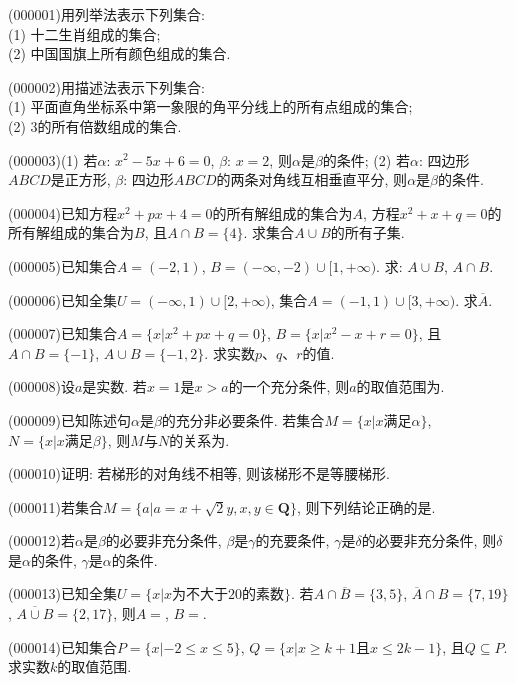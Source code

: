 \item (000001)用列举法表示下列集合:\\
(1) 十二生肖组成的集合;\\
(2) 中国国旗上所有颜色组成的集合.
\item (000002)用描述法表示下列集合:\\
(1) 平面直角坐标系中第一象限的角平分线上的所有点组成的集合;\\
(2) $3$的所有倍数组成的集合.
\item (000003)(1) 若$\alpha$: $x^2-5x+6=0$, $\beta$: $x=2$, 则$\alpha$是$\beta$的条件;
(2) 若$\alpha$: 四边形$ABCD$是正方形, $\beta$: 四边形$ABCD$的两条对角线互相垂直平分, 则$\alpha$是$\beta$的条件.
\item (000004)已知方程$x^2+px+4=0$的所有解组成的集合为$A$, 方程$x^2+x+q=0$的所有解组成的集合为$B$, 且$A\cap B=\{4\}$. 求集合$A\cup B$的所有子集.
\item (000005)已知集合$A=(-2, 1)$, $B=(-\infty, -2)\cup [1, +\infty)$. 求: $A\cup B$, $A\cap B$.
\item (000006)已知全集$U=(-\infty, 1)\cup [2, +\infty)$, 集合$A=(-1, 1)\cup [3, +\infty)$. 求$\overline{A}$.
\item (000007)已知集合$A=\{x|x^2+px+q=0\}$, $B=\{x|x^2-x+r=0\}$, 且$A\cap B=\{-1\}$, $A\cup B=\{-1, 2\}$. 求实数$p$、$q$、$r$的值.
\item (000008)设$a$是实数. 若$x=1$是$x>a$的一个充分条件, 则$a$的取值范围为.
\item (000009)已知陈述句$\alpha$是$\beta$的充分非必要条件. 若集合$M=\{x|x\text{满足}\alpha\}$, $N=\{x|x\text{满足}\beta\}$, 则$M$与$N$的关系为.
\item (000010)证明: 若梯形的对角线不相等, 则该梯形不是等腰梯形.
\item (000011)若集合$M=\{a|a=x+\sqrt2y, x,y\in \mathbf{Q}\}$, 则下列结论正确的是.
\item (000012)若$\alpha$是$\beta$的必要非充分条件, $\beta$是$\gamma$的充要条件, $\gamma$是$\delta$的必要非充分条件, 则$\delta$是$\alpha$的条件, $\gamma$是$\alpha$的条件.
\item (000013)已知全集$U=\{x|x\text{为不大于}20\text{的素数}\}$. 若$A\cap \overline{B}=\{3, 5\}$, $\overline{A}\cap B=\{7, 19\}$, $\overline{A\cup B}=\{2, 17\}$, 则$A=$, $B=$.
\item (000014)已知集合$P=\{x|-2\le x\le 5\}$, $Q=\{x|x\ge k+1\text{且}x\le 2k-1\}$, 且$Q\subseteq P$. 求实数$k$的取值范围.
